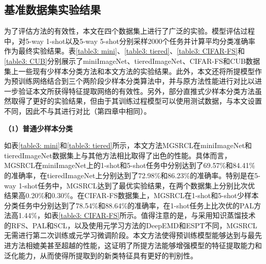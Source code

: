 \subsection[\hspace{-2pt}基准数据集实验结果]{{\heiti{} \hspace{-8pt}基准数据集实验结果}}\label{section3: 基准数据集实验结果}

为了评估方法的有效性，本文在四个数据集上进行了广泛的实验。模型评估过程中，对5-way 1-shot以及5-way 5-shot分别采样2000个任务并计算平均分类准确率作为最终实验结果。表\ref{table3: mini}、\ref{table3: tiered}、\ref{table3: CIFAR-FS}和\ref{table3: CUB}分别展示了miniImageNet、tieredImageNet、CIFAR-FS和CUB数据集上一些现有少样本分类方法和本文方法的实验结果。此外，本文还将所提模型作为预训练网络结合到三个两阶段少样本分类算法中，并与原方法性能进行对比以进一步验证本文所获得特征提取网络的有效性。另外，部分直推式少样本分类方法\cite{cui2021parameterless, qi2021transductive}虽然取得了更好的实验结果，但由于其训练过程模型可以使用测试数据，与本文设置不同，因此不与其进行对比（第四章中相同）。


\textbf{（1）普通少样本分类}

如表\ref{table3: mini}和\ref{table3: tiered}所示，本文方法MGSRCL在miniImageNet和tieredImageNet数据集上与其他方法相比取得了出色的性能。具体而言，MGSRCL在miniImageNet上的1-shot和5-shot任务中分别达到了69.57\%和84.41\%的准确率，在tieredImageNet上分别达到了72.98\%和86.23\%的准确率。特别是在5-way 1-shot任务中，MGSRCL达到了最优实验结果，在两个数据集上分别比次优结果高0.20\%和0.30\%。在CIFAR-FS数据集上，MGSRCL在1-shot和5-shot少样本分类任务中分别达到了78.54\%和88.64\%的准确率，在1-shot任务上比次优的PAL方法高1.44\%，如表\ref{table3: CIFAR-FS}所示。值得注意的是，与采用知识蒸馏技术的RFS\cite{RFS}、PAL\cite{PAL}和SCL\cite{Spatial}，以及使用元学习方法的DeepEMD\cite{DeepEMD}和ESPT\cite{ESPT}不同，MGSRCL无需进行第二次训练或元学习微调阶段。本文方法使得预训练模型能够达到与最先进方法相媲美甚至超越的性能，这证明了所提方法能够增强模型的特征提取能力和泛化能力，从而使得所提取到的新类特征具有更好的判别性。

